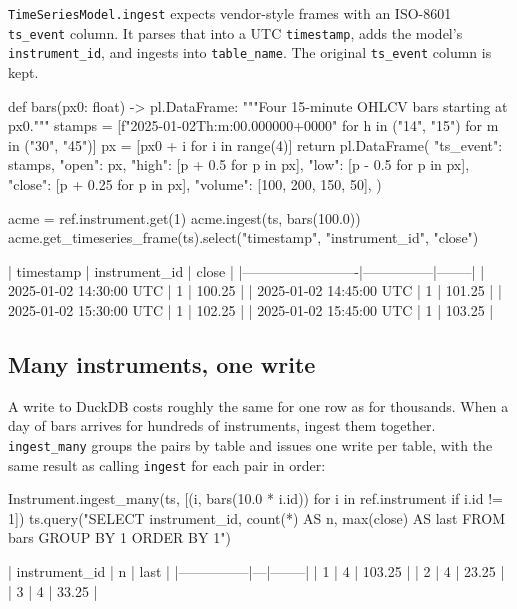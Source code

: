 \documentclass[11pt,a4paper]{article}
\newcommand{\code}[1]{\texttt{#1}}
\begin{document}
\code{TimeSeriesModel.ingest} expects vendor-style frames with an ISO-8601
\code{ts\_event} column. It parses that into a UTC \code{timestamp}, adds the model's
\code{instrument\_id}, and ingests into \code{table\_name}. The original \code{ts\_event}
column is kept.

\begin{python}
def bars(px0: float) -> pl.DataFrame:
    """Four 15-minute OHLCV bars starting at px0."""
    stamps = [f"2025-01-02T{h}:{m}:00.000000+0000" for h in ("14", "15") for m in ("30", "45")]
    px = [px0 + i for i in range(4)]
    return pl.DataFrame({
        "ts_event": stamps,
        "open": px,
        "high": [p + 0.5 for p in px],
        "low": [p - 0.5 for p in px],
        "close": [p + 0.25 for p in px],
        "volume": [100, 200, 150, 50],
    })

acme = ref.instrument.get(1)
acme.ingest(ts, bars(100.0))
acme.get_timeseries_frame(ts).select("timestamp", "instrument_id", "close")
\end{python}
\begin{console}
| timestamp               | instrument_id | close  |
|-------------------------|---------------|--------|
| 2025-01-02 14:30:00 UTC | 1             | 100.25 |
| 2025-01-02 14:45:00 UTC | 1             | 101.25 |
| 2025-01-02 15:30:00 UTC | 1             | 102.25 |
| 2025-01-02 15:45:00 UTC | 1             | 103.25 |
\end{console}

\subsection{Many instruments, one write}

A write to DuckDB costs roughly the same for one row as for thousands. When a day of bars
arrives for hundreds of instruments, ingest them together. \code{ingest\_many} groups the
pairs by table and issues one write per table, with the same result as calling
\code{ingest} for each pair in order:

\begin{python}
Instrument.ingest_many(ts, [(i, bars(10.0 * i.id)) for i in ref.instrument if i.id != 1])
ts.query("SELECT instrument_id, count(*) AS n, max(close) AS last FROM bars GROUP BY 1 ORDER BY 1")
\end{python}
\begin{console}
| instrument_id | n | last   |
|---------------|---|--------|
| 1             | 4 | 103.25 |
| 2             | 4 | 23.25  |
| 3             | 4 | 33.25  |
\end{console}
\end{document}
